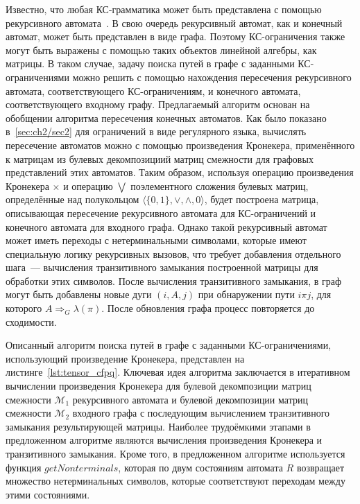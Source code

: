 Известно, что любая КС-грамматика может быть представлена с помощью рекурсивного автомата~\cite{alur2005analysis}. В свою очередь рекурсивный автомат, как и конечный автомат, может быть представлен в виде графа. Поэтому КС-ограничения также могут быть выражены с помощью таких объектов линейной алгебры, как матрицы. В таком случае, задачу поиска путей в графе с заданными КС-ограничениями можно решить с помощью нахождения пересечения рекурсивного автомата, соответствующего КС-ограничениям, и конечного автомата, соответствующего входному графу. Предлагаемый алгоритм основан на обобщении алгоритма пересечения конечных автоматов. Как было показано в~\cref{sec:ch2/sec2} для ограничений в виде регулярного языка, вычислять пересечение автоматов можно с помощью произведения Кронекера, применённого к матрицам из булевых декомпозициий матриц смежности для графовых представлений этих автоматов. Таким образом, используя операцию произведения Кронекера $\times$ и операцию $\bigvee$ поэлементного сложения булевых матриц, определённые над полукольцом $\langle \{0, 1\}, \vee, \wedge, 0 \rangle$, будет построена матрица, описывающая пересечение рекурсивного автомата для КС-ограничений и конечного автомата для входного графа. Однако такой рекурсивный автомат может иметь переходы с нетерминальными символами, которые имеют специальную логику рекурсивных вызовов, что требует добавления отдельного шага~--- вычисления транзитивного замыкания построенной матрицы для обработки этих символов. После вычисления транзитивного замыкания, в граф могут быть добавлены новые дуги $(i, A, j)$ при обнаружении пути $i\pi j$, для которого $A \Rightarrow_G \lambda(\pi)$. После обновления графа процесс повторяется до сходимости.

Описанный алгоритм поиска путей в графе с заданными КС-ограничениями, использующий произведение Кронекера, представлен на листинге~\ref{lst:tensor_cfpq}. Ключевая идея алгоритма заключается в итеративном вычислении произведения Кронекера для булевой декомпозиции матриц смежности $\mathcal{M}_1$ рекурсивного автомата и булевой декомпозиции матриц смежности $\mathcal{M}_2$ входного графа с последующим вычислением транзитивного замыкания результирующей матрицы. Наиболее трудоёмкими этапами в предложенном алгоритме являются вычисления произведения Кронекера и транзитивного замыкания. Кроме того, в предложенном алгоритме используется функция $\textit{getNonterminals}$, которая по двум состояниям автомата $R$ возвращает множество нетерминальных символов, которые соответствуют переходам между этими состояниями. 

